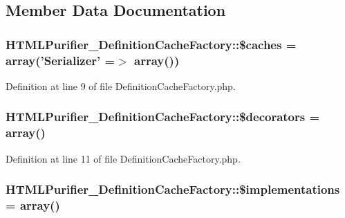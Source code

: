 \subsection{Member Data Documentation}
\hypertarget{classHTMLPurifier__DefinitionCacheFactory_a9bdfdc5a945ea8d47fabc3adfd50c807}{
\subsubsection[{\$caches}]{\setlength{\rightskip}{0pt plus 5cm}H\+T\+M\+L\+Purifier\+\_\+\+Definition\+Cache\+Factory\+::\$caches = array('Serializer' =$>$ array())\hspace{0.3cm}{\ttfamily [protected]}}}\label{classHTMLPurifier__DefinitionCacheFactory_a9bdfdc5a945ea8d47fabc3adfd50c807}


Definition at line 9 of file Definition\+Cache\+Factory.\+php.

\hypertarget{classHTMLPurifier__DefinitionCacheFactory_a6e7d9245dd426ea65b11c25ae06b0c5b}{
\subsubsection[{\$decorators}]{\setlength{\rightskip}{0pt plus 5cm}H\+T\+M\+L\+Purifier\+\_\+\+Definition\+Cache\+Factory\+::\$decorators = array()\hspace{0.3cm}{\ttfamily [protected]}}}\label{classHTMLPurifier__DefinitionCacheFactory_a6e7d9245dd426ea65b11c25ae06b0c5b}


Definition at line 11 of file Definition\+Cache\+Factory.\+php.

\hypertarget{classHTMLPurifier__DefinitionCacheFactory_a0c7a76120ee346ab4c3c993d0f58cc4b}{
\subsubsection[{\$implementations}]{\setlength{\rightskip}{0pt plus 5cm}H\+T\+M\+L\+Purifier\+\_\+\+Definition\+Cache\+Factory\+::\$implementations = array()\hspace{0.3cm}{\ttfamily [protected]}}}\label{classHTMLPurifier__DefinitionCacheFactory_a0c7a76120ee346ab4c3c993d0f58cc4b}


